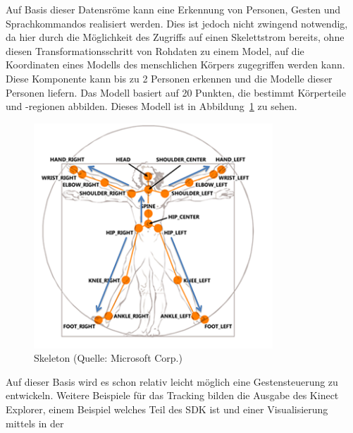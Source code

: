 \par\smallskip 
Auf Basis dieser Datensr\"ome kann eine Erkennung von Personen, Gesten und Sprachkommandos realisiert werden.
Dies ist jedoch nicht zwingend notwendig, da hier durch die M\"oglichkeit des Zugriffs auf einen Skelettstrom bereits, 
ohne diesen Transformationsschritt von Rohdaten zu einem Model, auf die Koordinaten eines Modells des menschlichen K\"orpers 
zugegriffen werden kann. Diese Komponente kann bis zu 2 Personen erkennen und die Modelle dieser Personen liefern\footnotemark[3].
Das Modell basiert auf 20 Punkten, die bestimmt K\"orperteile und -regionen abbilden. Dieses Modell ist in Abbildung~\ref{fig:skeleton} zu sehen.
\par\smallskip 
\begin{figure}[htb]
\centering
\includegraphics[width=0.8\textwidth]{img/04kapitel/skeleton.png}
\caption[Skeleton]{Skeleton (Quelle: Microsoft Corp.\footnotemark[3])}
\label{fig:skeleton}
\end{figure}
\newpage
Auf dieser Basis wird es schon relativ leicht m\"oglich eine Gestensteuerung zu entwickeln. Weitere Beispiele f\"ur das Tracking bilden die 
Ausgabe des Kinect Explorer\footnotemark[4], einem Beispiel welches Teil des SDK ist und einer Visualisierung mittels  in der 
